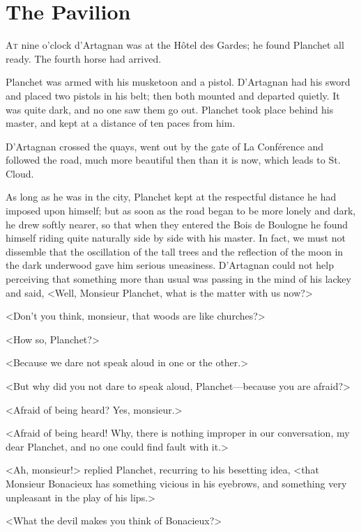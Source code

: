 
\chapter{The Pavilion}

\lettrine[]{A}{t} nine o'clock d'Artagnan was at the Hôtel des Gardes; he found Planchet all ready. The fourth horse had arrived. 

\zz
Planchet was armed with his musketoon and a pistol. D'Artagnan had his sword and placed two pistols in his belt; then both mounted and departed quietly. It was quite dark, and no one saw them go out. Planchet took place behind his master, and kept at a distance of ten paces from him. 

D'Artagnan crossed the quays, went out by the gate of La Conférence and followed the road, much more beautiful then than it is now, which leads to St. Cloud. 

As long as he was in the city, Planchet kept at the respectful distance he had imposed upon himself; but as soon as the road began to be more lonely and dark, he drew softly nearer, so that when they entered the Bois de Boulogne he found himself riding quite naturally side by side with his master. In fact, we must not dissemble that the oscillation of the tall trees and the reflection of the moon in the dark underwood gave him serious uneasiness. D'Artagnan could not help perceiving that something more than usual was passing in the mind of his lackey and said, <Well, Monsieur Planchet, what is the matter with us now?> 

<Don't you think, monsieur, that woods are like churches?> 

<How so, Planchet?> 

<Because we dare not speak aloud in one or the other.> 

<But why did you not dare to speak aloud, Planchet---because you are afraid?> 

<Afraid of being heard? Yes, monsieur.> 

<Afraid of being heard! Why, there is nothing improper in our conversation, my dear Planchet, and no one could find fault with it.> 

<Ah, monsieur!> replied Planchet, recurring to his besetting idea, <that Monsieur Bonacieux has something vicious in his eyebrows, and something very unpleasant in the play of his lips.> 

<What the devil makes you think of Bonacieux?> 

